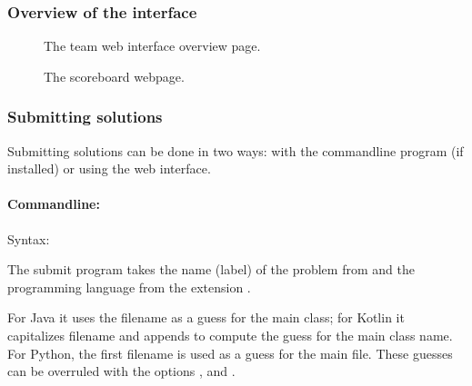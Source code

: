 \documentclass[a4paper,10pt,english,openany]{sphinxmanual}
\begin{document}
\clearpage


\subsubsection{Overview of the interface}
\label{\detokenize{team:overview-of-the-interface}}
\begin{figure}[htbp]
\centering
\capstart

\noindent{}
\caption{The team web interface overview page.}\label{\detokenize{team:id3}}\end{figure}

\begin{figure}[htbp]
\centering
\capstart

\noindent{}
\caption{The scoreboard webpage.}\label{\detokenize{team:id4}}\end{figure}




\subsubsection{Submitting solutions}
\label{\detokenize{team:submitting-solutions}}\label{\detokenize{team:submitting}}
\sphinxAtStartPar
Submitting solutions can be done in two ways: with the command\sphinxhyphen{}line
program  (if installed) or using the web interface.


\paragraph{Command\sphinxhyphen{}line: }
\label{\detokenize{team:command-line-submit}}
\sphinxAtStartPar
Syntax:

\begin{sphinxVerbatim}[commandchars=\\\{\}]
 \PYG{p}{[}\PYG{p}{]}  
\end{sphinxVerbatim}

\sphinxAtStartPar
The submit program takes the name (label) of the problem from
 and the programming language from the extension
.

\sphinxAtStartPar
For Java it uses the filename as a guess for the
main class; for Kotlin it capitalizes filename and appends
 to compute the guess for the main class name. For Python,
the first filename is used as a guess for the main file.
These guesses can be overruled with the options
,  and
.
\end{document}
